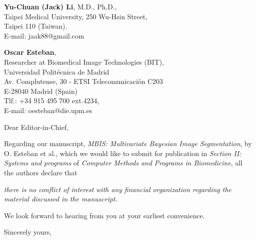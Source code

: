 \documentclass[11pt]{letter} %
\begin{document}

\begin{letter}{\textbf{Yu-Chuan (Jack) Li}, M.D., Ph.D., \\
Taipei Medical University, 250 Wu-Hsin Street, \\ 
Taipei 110 (Taiwan). \\ 
E-mail: jaak88@gmail.com
} 




\begin{flushright}
\textbf{Oscar Esteban}, \\ %
Researcher at Biomedical Image Technologies (BIT), \\ 
Universidad Polit\'ecnica de Madrid \\ 
Av. Complutense, 30 - ETSI Telecomunicaci\'on C203 \\
E-28040 Madrid (Spain) \\
Tlf.: +34 915 495 700 ext.4234,\\
E-mail: oesteban@die.upm.es %
\end{flushright} 
\vfill

\signature{Oscar Esteban} %


\opening{Dear Editor-in-Chief,}

Regarding our manuscript, \emph{MBIS: Multivariate Bayesian Image Segmentation}, by O. Esteban et al.,
which we would like to submit for publication in \emph{Section II: Systems and programs} of \emph{Computer Methods
and Programs in Biomedicine}, all the authors declare that

\emph{there is no conflict of interest with any financial organization regarding the material discussed 
in the manuscript}.

We look forward to hearing from you at your earliest convenience.

\closing{Sincerely yours,}
\vfill



\end{letter}
\end{document}
